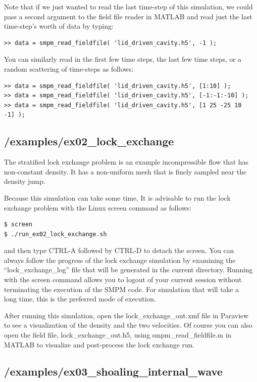 \documentclass[onside]{article}
\begin{document}
Note that if we just wanted to read the last time-step of this simulation, we could pass a second argument to the field file reader in MATLAB and read just the last time-step's worth of data by typing:
\begin{verbatim}
>> data = smpm_read_fieldfile( 'lid_driven_cavity.h5', -1 );
\end{verbatim}

You can similarly read in the first few time steps, the last few time steps, or a random scattering of time-steps as follows:
\begin{verbatim}
>> data = smpm_read_fieldfile( 'lid_driven_cavity.h5', [1:10] );
>> data = smpm_read_fieldfile( 'lid_driven_cavity.h5', [-1:-1:-10] );
>> data = smpm_read_fieldfile( 'lid_driven_cavity.h5', [1 25 -25 10 -1] );
\end{verbatim}

\subsection{/examples/ex02\_lock\_exchange}

The stratified lock exchange problem is an example incompressible flow that has non-constant density.  It has a non-uniform mesh that is finely sampled near the density jump.

Because this simulation can take some time, It is advisable to run the lock exchange problem with the Linux screen command as follows:

\begin{verbatim}
$ screen
$ ./run_ex02_lock_exchange.sh
\end{verbatim}
and then type CTRL-A followed by CTRL-D to detach the screen.  You can always follow the progress of the lock exchange simulation by
examining the ``lock\_exchange\_log'' file that will be generated in the current directory.  Running with the screen command allows you to
logout of your current session without terminating the execution of the SMPM code.  For simulation that will take a long time, this is
the preferred mode of execution.

After running this simulation, open the lock\_exchange\_out.xmf file in Paraview to see a visualization of the density and the two velocities.  Of course you can also open the field file, lock\_exchange\_out.h5, using smpm\_read\_fieldfile.m in MATLAB to visualize and post-process the lock exchange run.

\subsection{/examples/ex03\_shoaling\_internal\_wave}
\end{document}
